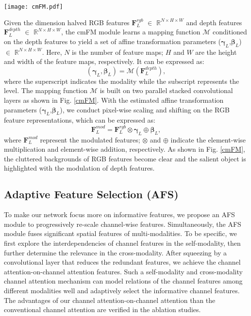 \documentclass[runningheads]{llncs}
\begin{document}
\begin{figure*}[!ht]
	\centering
	\texttt{[image: cmFM.pdf]}
	\caption{\textbf{The proposed cmFM module}. For the estimation of both  $\bm{\gamma}$ and $\bm{\beta}$, the kernels of convolutional layers are 7$\times$7, 5$\times$5, 3$\times$3, and 3$\times$3. The feature extractor represents VGG-16 backbone. The feature maps are illustrated as heatmaps.}
	\label{cmFM}
\end{figure*}


Given the dimension halved RGB features $\mathbf{F}_{L}^{rgb}$ $\in$
$\mathbb{R}^{N\times H\times W}$ and depth features $\mathbf{F}_{L}^{depth}$ $\in$ $\mathbb{R}^{N\times H\times W}$,  the cmFM module learns a mapping function $\mathcal{M}$ conditioned on the depth features to yield a set of affine transformation parameters ($\bm{\gamma}_{L}$,$\bm{\beta}_{L}$) $\in$
$\mathbb{R}^{N\times H\times W}$. Here, $N$ is the number of feature maps; $H$ and $W$ are the height and width of the feature maps, respectively. It can be expressed as:
\begin{equation}
\label{equ_1}
(\bm{\gamma}_{L},\bm{\beta}_{L}) =\mathcal{M}(\mathbf{F}_{L}^{depth}),
\end{equation}
where the superscript indicates the modality while the subscript represents the level.  The mapping function $\mathcal{M}$ is built on two parallel stacked convolutional layers as shown in Fig. \ref{cmFM}.
With the estimated affine transformation parameters ($\bm{\gamma}_{L}$,$\bm{\beta}_{L}$), we conduct pixel-wise scaling and shifting on the RGB feature representations, which can be expressed as:
\begin{equation}
\label{equ_2}
\mathbf{F}_{L}^{mod}=\mathbf{F}_{L}^{rgb} \otimes \bm{\gamma}_{L}\oplus \bm{\beta}_{L},
\end{equation}
where $\mathbf{F}_{L}^{mod}$ represent the modulated features; $\otimes$ and $\oplus$ indicate the element-wise multiplication and element-wise addition, respectively. As shown in Fig. \ref{cmFM}, the cluttered backgrounds of RGB features become clear and the salient object is highlighted with the modulation of depth features.

\subsection{Adaptive Feature Selection (AFS)}

To make our network focus more on informative features, we propose an AFS module to progressively re-scale channel-wise features. Simultaneously, the AFS module fuses significant spatial features of multi-modalities. To be specific, we first explore the interdependencies of channel features in the self-modality, then further determine the relevance in the cross-modality. After squeezing by a convolutional layer that reduces the redundant features, we achieve the channel attention-on-channel attention features.  Such a self-modality and cross-modality channel attention mechanism can model relations of the channel features among different modalities well and adaptively select the informative channel features. The advantages of our channel attention-on-channel attention than the conventional channel attention are verified in the ablation studies.
\end{document}
